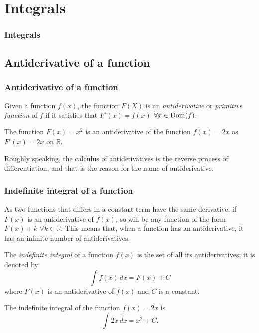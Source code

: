 
\section{Integrals}
\begin{frame}
\frametitle{Integrals}
\tableofcontents[sectionstyle=show/hide,hideothersubsections]
\end{frame}



\subsection{Antiderivative of a function}
\begin{frame}
\frametitle{Antiderivative of a function}
\begin{definition}
Given a function $f(x)$, the function $F(X)$ is an \emph{antiderivative} or \emph{primitive function} of $f$ if it satisfies that $F'(x)=f(x)$ $\forall x \in {\operatorname{Dom}}(f)$.
\end{definition}

 The function $F(x)=x^2$ is an antiderivative of the function $f(x)=2x$ as $F'(x)=2x$ on $\mathbb{R}$.

Roughly speaking, the calculus of antiderivatives is the reverse process of differentiation, and that is the reason for the name of antiderivative. 
\end{frame}


\begin{frame}
\frametitle{Indefinite integral of a function}
As two functions that differs in a constant term have the same derivative, if $F(x)$ is an antiderivative of $f(x)$, so will be any function of the form $F(x)+k$ $\forall k \in \mathbb{R}$.
This means that, when a function has an antiderivative, it has an infinite number of antiderivatives. 

\begin{definition}
The \emph{indefinite integral} of a function $f(x)$ is the set of all its antiderivatives; it is denoted by
\[
\int{f(x)}\,dx=F(x)+C
\]
where $F(x)$ is an antiderivative of $f(x)$ and $C$ is a constant.
\end{definition}

 The indefinite integral of the function $f(x)=2x$ is
\[\int 2x\, dx = x^2+C.\]
\end{frame}


